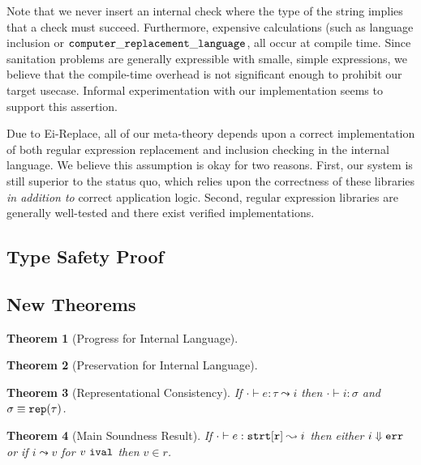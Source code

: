 \documentclass[10pt,preprint]{sigplanconf}
\newtheorem{thm}{Theorem}
\theoremstyle{definition}
\newcommand{\ireduces}{ \Downarrow }
\newcommand{\sreduces}{ \leadsto }
\newcommand{\trep}{{\tt rep}}
\newcommand{\ival}{ \ {\tt ival} }
\begin{document}
\twocolumn

Note that we never insert an internal check where the type of the string implies
that a check must succeed. Furthermore, expensive calculations (such as language
inclusion or ${\tt computer\_replacement\_language}$, all occur at compile time.
Since sanitation problems are generally expressible with smalle, simple expressions,
we believe that the compile-time overhead is not significant enough to prohibit
our target usecase. Informal experimentation with our implementation seems to
support this assertion.

Due to Ei-Replace, all of our meta-theory depends upon a correct implementation
of both regular expression replacement and inclusion checking in the internal language.
We believe this assumption is okay for two reasons. First, our system is still
superior to the status quo, which relies upon the correctness of these libraries
\emph{in addition to} correct application logic. Second, regular expression libraries are
generally well-tested and there exist verified implementations.

\subsection{Type Safety Proof}

\subsection{New Theorems}

\begin{thm}[Progress for Internal Language]
\end{thm}

\begin{thm}[Preservation for Internal Language]
\end{thm}


\begin{thm}[Representational Consistency]
If $\cdot \vdash e : \tau \sreduces i$ then $\cdot \vdash i : \sigma$ and $\sigma \equiv \trep(\tau)$.
\end{thm}

\begin{thm}[Main Soundness Result]
  If $\cdot \vdash e : \estrt{r} \sreduces i$ then either $i \ireduces \err$ or
  if $i \sreduces v$ for $v \ival$ then $v \in r$.
\end{thm}
\end{document}
